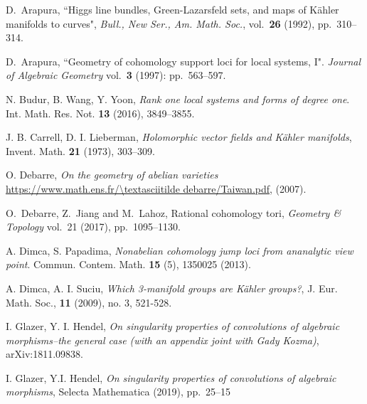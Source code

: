 \documentclass[a4paper,12pt,reqno]{amsart}
\theoremstyle{plain}
\theoremstyle{definition}
\theoremstyle{remark}
\begin{document}
\begin{thebibliography}{HKLR} 





 D.\ Arapura, ``Higgs line bundles, Green-Lazarsfeld sets, and maps of K\"ahler manifolds to curves", \textit{Bull., New Ser.,
Am. Math. Soc.}, vol.\ \textbf{26} (1992), pp.\ 310--314.

 D.\ Arapura, ``Geometry of cohomology support loci for local systems, I". \textit{Journal of Algebraic Geometry} vol.\ \textbf{3} (1997): pp.\ 563--597.


 N. Budur, B. Wang, Y. Yoon, \textit{Rank one local systems and forms of degree one}. Int. Math. Res. Not. \textbf{13} (2016), 3849--3855.



 J. B. Carrell, D. I. Lieberman,  \textit{Holomorphic vector fields and K\"ahler manifolds}, Invent. Math. \textbf{21} (1973), 303--309.

 O. Debarre,  \textit{On the geometry of abelian varieties} \url{https://www.math.ens.fr/\textasciitilde debarre/Taiwan.pdf}, (2007).

 O.\ Debarre, Z.\ Jiang and M.\ Lahoz, Rational cohomology tori, \textit{Geometry \& Topology} vol.\ 21 (2017),
pp.\ 1095--1130.

A. Dimca, S. Papadima, \textit{Nonabelian cohomology jump loci from ananalytic view point}. Commun. Contem. Math. \textbf{15} (5), 1350025 (2013).


 A. Dimca, A. I. Suciu, \textit{Which 3-manifold groups are K\"ahler groups?}, J. Eur. Math. Soc., \textbf{11} (2009), no. 3, 521-528.

 I. Glazer, Y. I. Hendel, \textit{On singularity properties of convolutions of algebraic morphisms--the general case (with an appendix joint with Gady Kozma)}, arXiv:1811.09838.

  I. Glazer, Y.I. Hendel, \textit{On singularity properties of convolutions of algebraic morphisms}, Selecta Mathematica (2019), pp.\ 25--15



\end{thebibliography}
\end{document}

